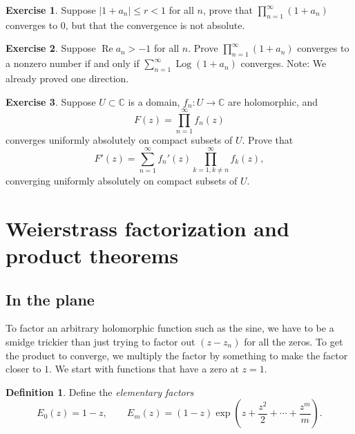 \documentclass[12pt,openany]{book}
\renewcommand{\Re}{\operatorname{Re}}
\newcommand{\Log}{\operatorname{Log}}
\newcommand{\sabs}[1]{\lvert {#1} \rvert}
\newcommand{\C}{{\mathbb{C}}}
\newcommand{\myindex}[1]{#1\index{#1}}
\theoremstyle{plain}
\theoremstyle{remark}
\theoremstyle{definition}
\newtheorem{defn}[thm]{Definition}
\newenvironment{exbox}{%
    \def\FrameCommand{\vrule width 1pt \relax\hspace{10pt}}%
    \MakeFramed{\advance\hsize-\width\FrameRestore}%
}{%
    \endMakeFramed
}
\theoremstyle{exercise}
\newtheorem{exercise}{Exercise}[section]
\theoremstyle{example}
\begin{document}
\begin{exbox}
\begin{exercise}
Suppose $\sabs{1+a_n} \leq r < 1$ for all
$n$, 
prove that $\prod_{n=1}^\infty (1+a_n)$ converges to $0$, but that the
convergence is not absolute.
\end{exercise}

\begin{exercise}
Suppose $\Re a_n > -1$ for all $n$.  
Prove 
$\prod_{n=1}^\infty (1+a_n)$
converges to a nonzero number if and only if
$\sum_{n=1}^\infty \Log (1+a_n)$ converges.  Note: We already proved one
direction.
\end{exercise}

\begin{exercise}%
\label{exercise:proddiff}
Suppose $U \subset \C$ is a domain,
$f_n \colon U \to \C$ are holomorphic, and
\begin{equation*}
F(z) = \prod_{n=1}^\infty f_n(z)
\end{equation*}
converges uniformly absolutely
on compact subsets of $U$.  Prove that
\begin{equation*}
F'(z) = \sum_{n=1}^\infty f_n'(z) \prod_{k=1, k\not=n}^\infty f_k(z) ,
\end{equation*}
converging uniformly absolutely on compact subsets of $U$.
\end{exercise}
\end{exbox}


\section{Weierstrass factorization and product theorems}
\label{sec:weier}

\subsection{In the plane}

To factor an arbitrary holomorphic function such as the sine,
we have to be a smidge trickier than just trying to factor out $(z-z_n)$
for all the zeros.  To
get the product to converge, we multiply the factor by something to
make the factor closer to $1$.  We start with functions that have a zero at
$z=1$.

\begin{defn}
Define the \emph{\myindex{elementary factors}}
%
\begin{equation*}
E_0(z) = 1-z, \qquad
E_m(z) = (1-z) \exp\left( z +\frac{z^2}{2} + \cdots + \frac{z^m}{m} \right)
.
\end{equation*}
\end{defn}
\end{document}
